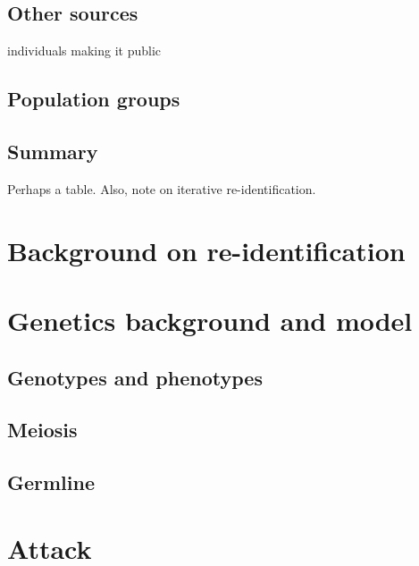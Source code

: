 \documentclass{article}
\begin{document}
\subsection{Other sources}
individuals making it public

\subsection{Population groups}

\subsection{Summary}
Perhaps a table. Also, note on iterative re-identification.


\section{Background on re-identification}
\label{reidentification}


\section{Genetics background and model}
\label{genetics-background}


\subsection{Genotypes and phenotypes}
\label{genotypephenotype}

\subsection{Meiosis}

\subsection{Germline}

\section{Attack}
\label{attack}
\end{document}
